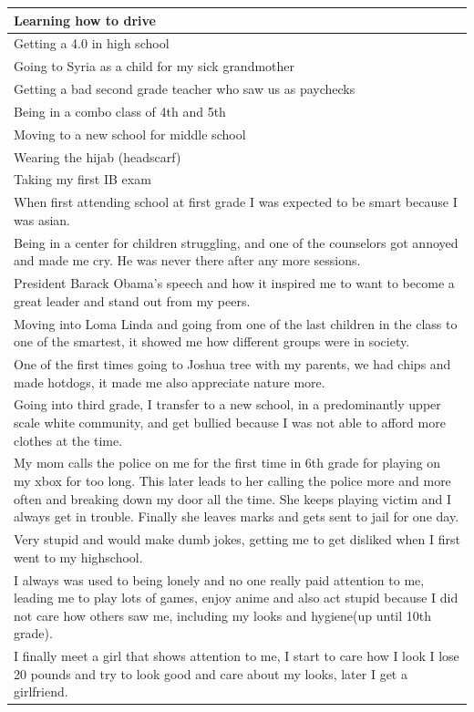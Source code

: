 \documentclass[
  .7em,
  letterpaper,
  DIV=11,
  numbers=noendperiod]{scrartcl}
\begin{document}
\begin{table}
\begin{tabular}{l}
\hline
Learning how to drive\\
\hline
Getting a 4.0 in high school\\
\hline
Going to Syria as a child for my sick grandmother\\
\hline
Getting a bad second grade teacher who saw us as paychecks\\
\hline
Being in a combo class of 4th and 5th\\
\hline
Moving to a new school for middle school\\
\hline
Wearing the hijab (headscarf)\\
\hline
Taking my first IB exam\\
\hline
When first attending school at first grade I was expected to be smart because I was asian.\\
\hline
Being in a center for children struggling, and one of the counselors got annoyed and made me cry. He was never there after any more sessions.\\
\hline
President Barack Obama's speech and how it inspired me to want to become a great leader and stand out from my peers.\\
\hline
Moving into Loma Linda and going from one of the last children in the class to one of the smartest, it showed me how different groups were in society.\\
\hline
One of the first times going to Joshua tree with my parents, we had chips and made hotdogs, it made me also appreciate nature more.\\
\hline
Going into third grade, I transfer to a new school, in a predominantly upper scale white community, and get bullied because I was not able to afford more clothes at the time.\\
\hline
My mom calls the police on me for the first time in 6th grade for playing on my xbox for too long. This later leads to her calling the police more and more often and breaking down my door all the time. She keeps playing victim and I always get in trouble. Finally she leaves marks and gets sent to jail for one day.\\
\hline
Very stupid and would make dumb jokes, getting me to get disliked when I first went to my highschool.\\
\hline
I always was used to being lonely and no one really paid attention to me, leading me to play lots of games, enjoy anime and also act stupid because I did not care how others saw me, including my looks and hygiene(up until 10th grade).\\
\hline
I finally meet a girl that shows attention to me, I start to care how I look I lose 20 pounds and try to look good and care about my looks, later I get a girlfriend.\\

\end{tabular}
\end{table}
\end{document}
